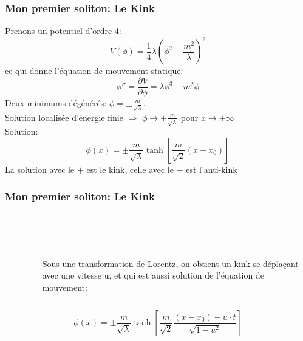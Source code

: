\documentclass{beamer}
\begin{document}
\begin{frame}
\frametitle{Mon premier soliton: \textbf{Le Kink}}
Prenons un potentiel d'ordre 4:
\begin{equation*}
V\left( \phi \right) = \frac{1}{4} \lambda \left(   \phi^{2} -\frac{m^{2}}{\lambda}  \right) ^{2}
\end{equation*}
ce qui donne l'équation de mouvement statique:
\begin{equation*}
\phi'' =  \dfrac{\partial V}{\partial \phi} = \lambda \phi ^{3} -m^{2} \phi
\end{equation*}
Deux minimums dégénérés: $\phi = \pm  \frac{m}{\sqrt{\lambda}} $.\\
Solution localisée d'énergie finie $\Rightarrow$ $\phi\rightarrow \pm  \frac{m}{\sqrt{\lambda}}$ pour $x\rightarrow \pm \infty$\\
Solution:
\begin{equation*}
\phi(x) =  \pm \frac{m}{\sqrt{\lambda}} \tanh \left[  \frac{m}{\sqrt{2}} (x-x_{0})     \right] 
\end{equation*}
La solution avec le $+$ est le kink, celle avec le $-$ est l'anti-kink
\end{frame}


\begin{frame}
\frametitle{Mon premier soliton: \textbf{Le Kink}}
     \begin{columns}[t] %
     \begin{column}[T]{4cm} %
     \begin{figure}
     \end{figure}
     \end{column}
     \begin{column}[T]{6cm}
     ~~\\
     ~~\\
     ~~\\
     Sous une transformation de Lorentz, on obtient un kink se déplaçant avec une vitesse u, et qui est aussi solution de l'équation de mouvement:
     \end{column}
     \end{columns}
\begin{equation*}
\phi(x) =  \pm \frac{m}{\sqrt{\lambda}} \tanh \left[  \frac{m}{\sqrt{2}} 
\dfrac{(x-x_{0}) -u\cdot t}{\sqrt{1-u^{2}}}     \right] 
\end{equation*}
\end{frame}
\end{document}
